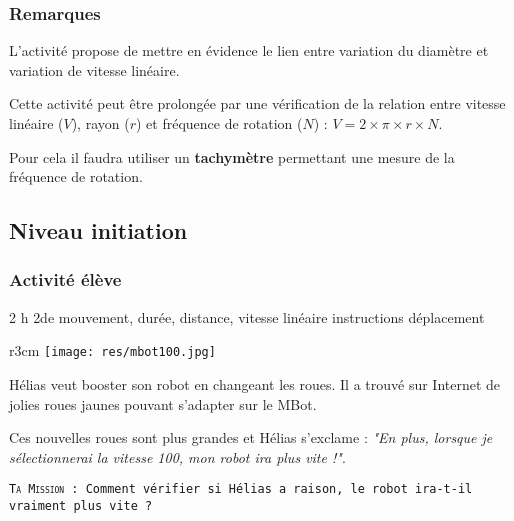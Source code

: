 \subsubsection{Remarques}


\begin{methode}
    L'activité propose de mettre en évidence le lien entre variation du diamètre et variation de vitesse linéaire.
    
    Cette activité peut être prolongée par une vérification de la relation entre vitesse linéaire ($V$), rayon ($r$) et fréquence de rotation ($N$) : $V = 2 \times \pi \times r \times N$.
    
    Pour cela il faudra utiliser un \textbf{tachymètre} permettant une mesure de la fréquence de rotation.
    
\end{methode}

%
%

\newpage

\subsection{Niveau initiation}

\subsubsection{Activité élève}

\cartouche
{2 h}         %
{2de}           %
{}        %
{mouvement, durée, distance, vitesse linéaire}     %
{instructions déplacement}       %


\begin{wrapfigure}[5]{r}{3cm}
    \texttt{[image: res/mbot100.jpg]}
\end{wrapfigure}

\begin{eleve}

Hélias veut booster son robot en changeant les roues. Il a trouvé sur Internet de jolies roues jaunes pouvant s'adapter sur le MBot.

Ces nouvelles roues sont plus grandes et Hélias s'exclame : \textit{"En plus, lorsque je sélectionnerai la vitesse 100, mon robot ira plus vite !"}.

    \texttt{\textsc{Ta Mission} : 
    Comment vérifier si Hélias a raison, le robot ira-t-il vraiment plus vite ?
    }
\end{eleve}



